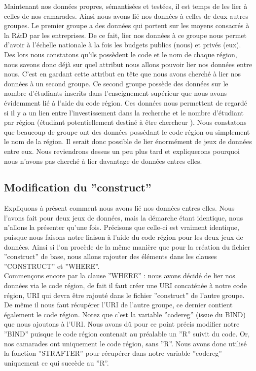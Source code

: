 \documentclass[a4paper,sffamily,12pt]{article}
\begin{document}
				Maintenant nos données propres, sémantisées et testées, il est temps de les lier à celles de nos camarades. Ainsi nous avons lié nos données à celles de deux autres groupes. Le premier groupe a des données qui portent sur les moyens consacrés à la R\&D par les entreprises. De ce fait, lier nos données à ce groupe nous permet d'avoir à l'échelle nationale à la fois les budgets publics (nous) et privés (eux). Des lors nous constatons qu'ils possèdent le code et le nom de chaque région, nous savons donc déjà sur quel attribut nous allons pouvoir lier nos données entre nous. C'est en gardant cette attribut en tête que nous avons cherché à lier nos données à un second groupe. Ce second groupe possède des données sur le nombre d'étudiants inscrits dans l'enseignement supérieur que nous avons évidemment lié à l'aide du code région. Ces données nous permettent de regardé si il y a un lien entre l'investissement dans la recherche et le nombre d'étudiant  par région (étudiant potentiellement destiné à être chercheur ). Nous constatons que beaucoup de groupe ont des données possédant le code région ou simplement le nom de la région. Il serait donc possible de lier énormément de jeux de données entre eux. Nous reviendrons dessus un peu plus tard et expliquerons pourquoi nous n'avons pas cherché à lier davantage de données entres elles. 

			\vspace{0.5cm}
			
		\subsection{Modification du ''construct''}
			
			\vspace{0.5cm}

			Expliquons à présent comment nous avons lié nos données entres elles. Nous l'avons fait pour deux jeux de données, mais la démarche étant identique, nous n'allons la présenter  qu'une fois. Précisons que celle-ci est vraiment identique, puisque nous faisons notre liaison à l'aide du code région pour les deux jeux de données. Ainsi si l'on procède de la même manière que pour la création du fichier ''construct'' de base, nous allons rajouter des éléments dans les clauses ''CONSTRUCT'' et ''WHERE''.  \\
			
			\indent Commençons encore par la clause ''WHERE'' : nous avons décidé de lier nos données via le code région, de fait il faut créer une URI concaténée à notre code région, URI qui devra être rajouté dans le fichier ''construct'' de l'autre groupe. De même il nous faut récupérer l'URI de l'autre groupe, ce dernier contient également le code région. Notez que c'est la variable ''codereg'' (issue du BIND) que nous ajoutons à l'URI. Nous avons dû pour ce point précis modifier notre ''BIND'' puisque le code région contenait au préalable un ''R'' suivit du code. Or, nos camarades ont uniquement le code région, sans ''R''. Nous avons donc utilisé la fonction ''STRAFTER'' pour récupérer dans notre variable ''codereg'' uniquement ce qui succède au ''R''. \\
			
\end{document}
